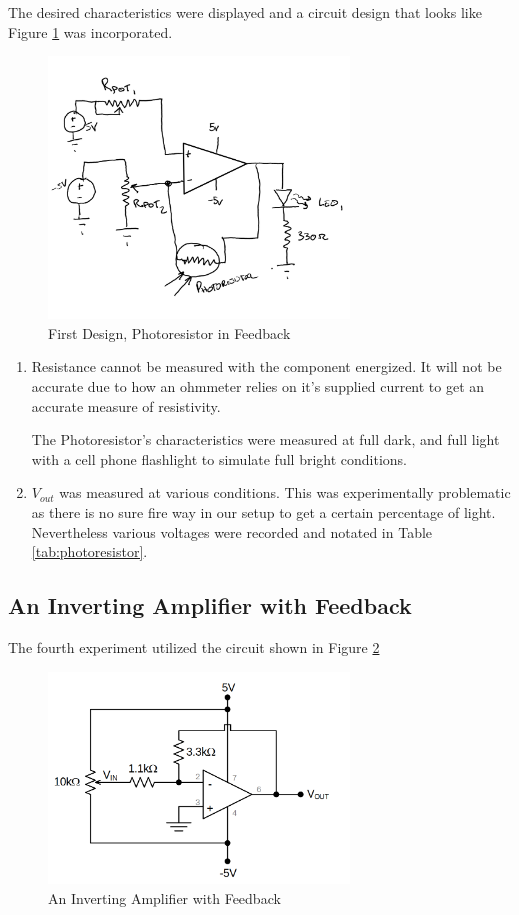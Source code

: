 \documentclass[12pt]{article}
\begin{document}
The desired characteristics were displayed and a circuit design that looks like
Figure \ref{fig:photoresistor} was incorporated.

\begin{figure}[H]
	\centering
	\includegraphics[width=8cm]{02_4}
	\caption{First Design, Photoresistor in Feedback}
	\label{fig:photoresistor}
\end{figure}

\begin{enumerate}
	\item Resistance cannot be measured with the component energized. It will not
	      be accurate due to how an ohmmeter relies on it's supplied current to get an
	      accurate measure of resistivity.

	      The Photoresistor's characteristics were measured at full dark, and full
	      light with a cell phone flashlight to simulate full bright conditions.
	\item \(V_{out}\) was measured at various conditions. This was experimentally
	      problematic as there is no sure fire way in our setup to get a certain
	      percentage of light. Nevertheless various voltages were recorded and notated
	      in Table \ref{tab:photoresistor}.
\end{enumerate}

\subsection{An Inverting Amplifier with Feedback}
The fourth experiment utilized the circuit shown in Figure \ref{fig:inverter}

\begin{figure}[H]
	\centering
	\includegraphics[width=8cm]{02_5}
	\caption{An Inverting Amplifier with Feedback}
	\label{fig:inverter}
\end{figure}
\end{document}
